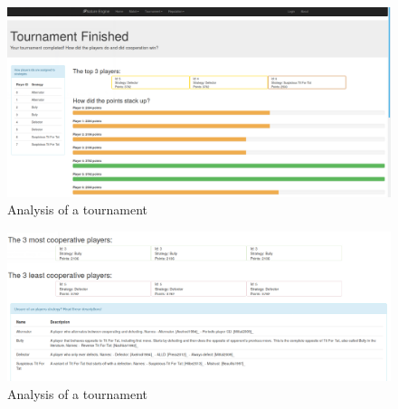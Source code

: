 \documentclass[]{final_report}
\begin{document}
\begin{figure}
	\includegraphics[width=\textwidth]{TournAnalysis.png}
	\caption{Analysis of a tournament}
	\label{fig:tourn_analysis}
\end{figure}
\begin{figure}
	\includegraphics[width=\textwidth]{TournAnalysis2.png}
	\caption{Analysis of a tournament}
	\label{fig:tourn_analysis2}
\end{figure}
\end{document}
